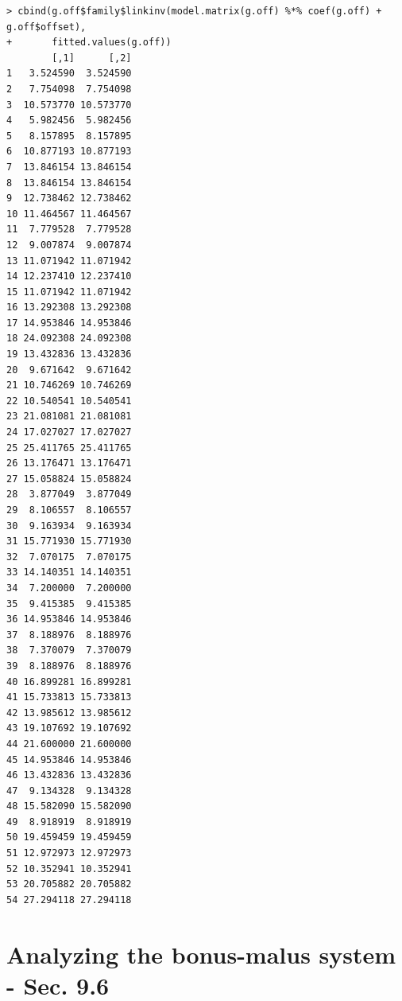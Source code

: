 \documentclass[11pt]{article}
\begin{document}
\begin{verbatim}
> cbind(g.off$family$linkinv(model.matrix(g.off) %*% coef(g.off) + g.off$offset),
+       fitted.values(g.off))
        [,1]      [,2]
1   3.524590  3.524590
2   7.754098  7.754098
3  10.573770 10.573770
4   5.982456  5.982456
5   8.157895  8.157895
6  10.877193 10.877193
7  13.846154 13.846154
8  13.846154 13.846154
9  12.738462 12.738462
10 11.464567 11.464567
11  7.779528  7.779528
12  9.007874  9.007874
13 11.071942 11.071942
14 12.237410 12.237410
15 11.071942 11.071942
16 13.292308 13.292308
17 14.953846 14.953846
18 24.092308 24.092308
19 13.432836 13.432836
20  9.671642  9.671642
21 10.746269 10.746269
22 10.540541 10.540541
23 21.081081 21.081081
24 17.027027 17.027027
25 25.411765 25.411765
26 13.176471 13.176471
27 15.058824 15.058824
28  3.877049  3.877049
29  8.106557  8.106557
30  9.163934  9.163934
31 15.771930 15.771930
32  7.070175  7.070175
33 14.140351 14.140351
34  7.200000  7.200000
35  9.415385  9.415385
36 14.953846 14.953846
37  8.188976  8.188976
38  7.370079  7.370079
39  8.188976  8.188976
40 16.899281 16.899281
41 15.733813 15.733813
42 13.985612 13.985612
43 19.107692 19.107692
44 21.600000 21.600000
45 14.953846 14.953846
46 13.432836 13.432836
47  9.134328  9.134328
48 15.582090 15.582090
49  8.918919  8.918919
50 19.459459 19.459459
51 12.972973 12.972973
52 10.352941 10.352941
53 20.705882 20.705882
54 27.294118 27.294118
\end{verbatim}

\section{Analyzing the bonus-malus system - Sec. 9.6}
\end{document}
